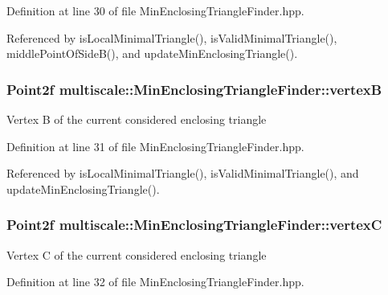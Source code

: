 \-Definition at line 30 of file \-Min\-Enclosing\-Triangle\-Finder.\-hpp.



\-Referenced by is\-Local\-Minimal\-Triangle(), is\-Valid\-Minimal\-Triangle(), middle\-Point\-Of\-Side\-B(), and update\-Min\-Enclosing\-Triangle().

\hypertarget{classmultiscale_1_1MinEnclosingTriangleFinder_a18e5ea5e0b341b3d02c4a75887f44c9c}{
\subsubsection[{vertex\-B}]{\setlength{\rightskip}{0pt plus 5cm}\-Point2f {\bf multiscale\-::\-Min\-Enclosing\-Triangle\-Finder\-::vertex\-B}}}\label{classmultiscale_1_1MinEnclosingTriangleFinder_a18e5ea5e0b341b3d02c4a75887f44c9c}
\-Vertex \-B of the current considered enclosing triangle 

\-Definition at line 31 of file \-Min\-Enclosing\-Triangle\-Finder.\-hpp.



\-Referenced by is\-Local\-Minimal\-Triangle(), is\-Valid\-Minimal\-Triangle(), and update\-Min\-Enclosing\-Triangle().

\hypertarget{classmultiscale_1_1MinEnclosingTriangleFinder_a0fc6887251f73b19714f39888534cdaa}{
\subsubsection[{vertex\-C}]{\setlength{\rightskip}{0pt plus 5cm}\-Point2f {\bf multiscale\-::\-Min\-Enclosing\-Triangle\-Finder\-::vertex\-C}}}\label{classmultiscale_1_1MinEnclosingTriangleFinder_a0fc6887251f73b19714f39888534cdaa}
\-Vertex \-C of the current considered enclosing triangle 

\-Definition at line 32 of file \-Min\-Enclosing\-Triangle\-Finder.\-hpp.



